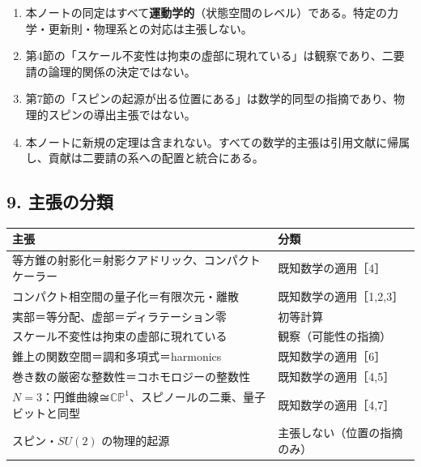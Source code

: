 \documentclass[
  a4paper,
]{ltjsarticle}
\newcounter{none} %
\providecommand{\tightlist}{%
  \setlength{\itemsep}{0pt}\setlength{\parskip}{0pt}}
\begin{document}
\begin{enumerate}
\def\labelenumi{\arabic{enumi}.}
\tightlist
\item
  本ノートの同定はすべて\textbf{運動学的}（状態空間のレベル）である。特定の力学・更新則・物理系との対応は主張しない。
\item
  第4節の「スケール不変性は拘束の虚部に現れている」は観察であり、二要請の論理的関係の決定ではない。
\item
  第7節の「スピンの起源が出る位置にある」は数学的同型の指摘であり、物理的スピンの導出主張ではない。
\item
  本ノートに新規の定理は含まれない。すべての数学的主張は引用文献に帰属し、貢献は二要請の系への配置と統合にある。
\end{enumerate}

\subsection{9. 主張の分類}\label{ux4e3bux5f35ux306eux5206ux985e}

{\def\LTcaptype{none} %
\begin{longtable}[]{@{}
  >{\raggedright\arraybackslash}p{}
  >{\raggedright\arraybackslash}p{}@{}}
\toprule\noalign{}
\begin{minipage}[b]{\linewidth}\raggedright
主張
\end{minipage} & \begin{minipage}[b]{\linewidth}\raggedright
分類
\end{minipage} \\
\midrule\noalign{}
\endhead
\bottomrule\noalign{}
\endlastfoot
等方錐の射影化＝射影クアドリック、コンパクトケーラー &
既知数学の適用［4］ \\
コンパクト相空間の量子化＝有限次元・離散 & 既知数学の適用［1,2,3］ \\
実部＝等分配、虚部＝ディラテーション零 & 初等計算 \\
スケール不変性は拘束の虚部に現れている & 観察（可能性の指摘） \\
錐上の関数空間＝調和多項式＝harmonics & 既知数学の適用［6］ \\
巻き数の厳密な整数性＝コホモロジーの整数性 & 既知数学の適用［4,5］ \\
\(N=3\)：円錐曲線≅\(\mathbb{CP}^1\)、スピノールの二乗、量子ビットと同型
& 既知数学の適用［4,7］ \\
スピン・\(SU(2)\) の物理的起源 & 主張しない（位置の指摘のみ） \\
\end{longtable}
}
\end{document}
